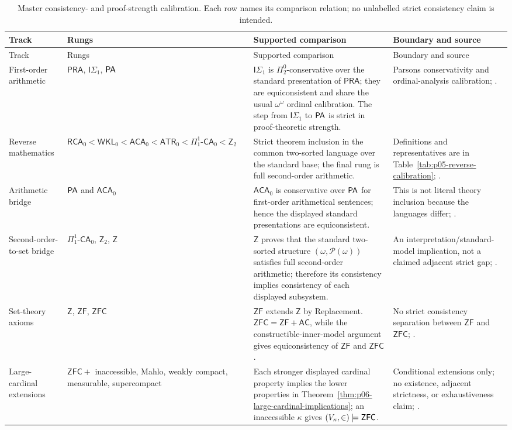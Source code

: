 \begingroup\footnotesize
\begin{longtable}{@{}p{}p{}p{}p{}@{}}
\caption{Master consistency- and proof-strength calibration.  Each row names
its comparison relation; no unlabelled strict consistency claim is intended.}
\label{tab:p06-consistency-strength-master}\\
\toprule
Track & Rungs & Supported comparison & Boundary and source \\
\midrule
\endfirsthead
\toprule
Track & Rungs & Supported comparison & Boundary and source \\
\midrule
\endhead
First-order arithmetic &
\(\mathsf{PRA}\), \(\mathsf I\Sigma_1\), \(\mathsf{PA}\) &
\(\mathsf I\Sigma_1\) is \(\Pi^0_2\)-conservative over the standard
presentation of \(\mathsf{PRA}\); they are equiconsistent and share the usual
\(\omega^\omega\) ordinal calibration.  The step from
\(\mathsf I\Sigma_1\) to \(\mathsf{PA}\) is strict in proof-theoretic strength. &
Parsons conservativity and ordinal-analysis calibration;
\cite{Parsons1970,Pohlers2009}. \\
\addlinespace
Reverse mathematics &
\(\mathsf{RCA}_0<\mathsf{WKL}_0<\mathsf{ACA}_0<
\mathsf{ATR}_0<\Pi^1_1\text{-}\mathsf{CA}_0<\mathsf Z_2\) &
Strict theorem inclusion in the common two-sorted language over the standard
base; the final rung is full second-order arithmetic. &
Definitions and representatives are in
Table~\ref{tab:p05-reverse-calibration}; \cite{Simpson2009}. \\
\addlinespace
Arithmetic bridge &
\(\mathsf{PA}\) and \(\mathsf{ACA}_0\) &
\(\mathsf{ACA}_0\) is conservative over \(\mathsf{PA}\) for first-order
arithmetical sentences; hence the displayed standard presentations are
equiconsistent. &
This is not literal theory inclusion because the languages differ;
\cite{Simpson2009}. \\
\addlinespace
Second-order-to-set bridge &
\(\Pi^1_1\text{-}\mathsf{CA}_0\), \(\mathsf Z_2\), \(\mathsf Z\) &
\(\mathsf Z\) proves that the standard two-sorted structure
\((\omega,\mathcal P(\omega))\) satisfies full second-order arithmetic;
therefore its consistency implies consistency of each displayed subsystem. &
An interpretation/standard-model implication, not a claimed adjacent strict
gap; \cite{Jech2003,Simpson2009}. \\
\addlinespace
Set-theory axioms &
\(\mathsf Z\), \(\mathsf{ZF}\), \(\mathsf{ZFC}\) &
\(\mathsf{ZF}\) extends \(\mathsf Z\) by Replacement.
\(\mathsf{ZFC}=\mathsf{ZF}+\mathsf{AC}\), while the constructible-inner-model
argument gives equiconsistency of \(\mathsf{ZF}\) and \(\mathsf{ZFC}\). &
No strict consistency separation between \(\mathsf{ZF}\) and
\(\mathsf{ZFC}\); \cite{Godel1938,Jech2003}. \\
\addlinespace
Large-cardinal extensions &
\(\mathsf{ZFC}+\) inaccessible, Mahlo, weakly compact, measurable,
supercompact &
Each stronger displayed cardinal property implies the lower properties in
Theorem~\ref{thm:p06-large-cardinal-implications}; an inaccessible
\(\kappa\) gives \((V_\kappa,\in)\models\mathsf{ZFC}\). &
Conditional extensions only; no existence, adjacent strictness, or
exhaustiveness claim; \cite{Kanamori2003}. \\
\bottomrule
\end{longtable}
